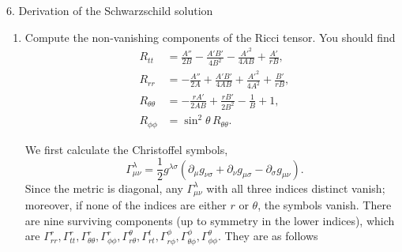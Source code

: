 \documentclass[11pt]{article}
\begin{document}
\begin{problem}{6. Derivation of the Schwarzschild solution}
\begin{enumerate}[label=(\alph*)]
\begin{proof}
\begin{equation}
\begin{aligned}
          \end{aligned}
        \end{equation}
        \begin{equation}
        \label{eq:11}
       \Rightarrow R = 2R,
      \end{equation}
      showing that the Ricci scalar satisfies \( R = 0 \).
      Substituting this back into \cref{eq:9} gives
      \begin{equation}
      \label{eq:12}
      R_{\mu\nu} = 0.
      \end{equation}
      Conversely, if \(R_{\mu\nu}=0\), then \(R=0\) and hence \(G_{\mu\nu}=0\).
          \end{proof}
		\item Compute the non-vanishing components of the Ricci tensor.
		      You should find
		      \begin{equation}
			      \label{eq:p6-ricci-components}
			      \begin{aligned}
				      R_{tt}           & =\frac{A''}{2B}-\frac{A'B'}{4B^2}-\frac{A'^2}{4AB}+\frac{A'}{rB},  \\
				      R_{rr}           & =-\frac{A''}{2A}+\frac{A'B'}{4AB}+\frac{A'^2}{4A^2}+\frac{B'}{rB}, \\
				      R_{\theta\theta} & =-\frac{rA'}{2AB}+\frac{rB'}{2B^2}-\frac1B+1,                      \\
				      R_{\phi\phi}     & =\sin^2\theta\,R_{\theta\theta}.
			      \end{aligned}
		      \end{equation}
          \begin{answer}
            We first calculate the Christoffel symbols,
            \begin{equation}
            \label{eq:4}
            \Gamma_{\mu\nu}^{\lambda} = \frac{1}{2}g^{\lambda\sigma} \left( \partial_{\mu}g_{\nu\sigma} + \partial_{\nu}g_{\mu\sigma} - \partial_{\sigma}g_{\mu\nu} \right).
            \end{equation}
            Since the metric is diagonal, any \(\Gamma_{\mu\nu}^{\lambda}\) with all three indices distinct vanish; moreover, if none of the indices are either \( r \) or \(\theta\), the symbols vanish.
            There are nine surviving components (up to symmetry in the lower indices), which are \( \Gamma_{rr}^r, \Gamma_{tt}^r, \Gamma_{\theta\theta}^r, \Gamma_{\phi\phi}^r, \Gamma_{r\theta}^{\theta}, \Gamma_{rt}^{t}, \Gamma_{r\phi}^{\phi}, \Gamma_{\theta\phi}^{\phi}, \Gamma_{\phi\phi}^{\theta} \).
            They are as follows

\end{answer}
\end{enumerate}
\end{problem}
\end{document}
